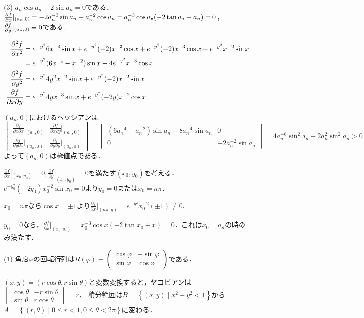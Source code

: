 \documentclass[
		book,
		head_space=20mm,
		foot_space=20mm,
		gutter=10mm,
		line_length=190mm
]{jlreq}
\begin{document}
(3) $a_n \cos a_n -2\sin a_n=0$である．$\pdv{f}{x}|_{(a_n,0)} =-2a_n^{-3}\sin a_n + a_n^{-2}\cos a_n =a_n^{-3}\cos a_n(-2 \tan a_n+a_n)=0$，$\pdv{f}{y}|_{(a_n,0)} =0$である．

\begin{align}
    \pdv[2]{f}{x}&=e^{-y^2}6x^{-4}\sin x+e^{-y^2}(-2)x^{-3}\cos x+e^{-y^2}(-2)x^{-3}\cos x-e^{-y^2}x^{-2}\sin x \\
    &=e^{-y^2}(6x^{-4}-x^{-2})\sin x -4e^{-y^2}x^{-3}\cos x \\
    \pdv[2]{f}{y}&=e^{-y^2}4y^2x^{-2}\sin x+e^{-y^2}(-2)x^{-2}\sin x\\
    \frac{\partial f}{\partial x \partial y}&=e^{-y^2}4yx^{-3}\sin x + e^{-y^2}(-2y)x^{-2}\cos x \\
\end{align}

$(a_n,0)$におけるヘッシアンは
$\begin{vmatrix}
    \frac{\partial f}{\partial x \partial x}|_{(a_n,0)} & \frac{\partial f}{\partial x \partial y}|_{(a_n,0)} \\
    \frac{\partial f}{\partial y \partial x}|_{(a_n,0)} & \frac{\partial f}{\partial y \partial y}|_{(a_n,0)}
\end{vmatrix} = \begin{vmatrix} 
    (6a_n^{-4}-a_n^{-2}) \sin a_n -8a_n^{-4}\sin a_n & 0 \\
        0 & -2 a_n^{-2}\sin a_n
\end{vmatrix}= 4a_n^{-6}\sin^2 a_n +2a_n^2\sin^2 a_n>0$
よって$(a_n,0)$は極値点である．

$\frac{\partial f}{\partial x}|_{(x_0,y_0)}=0, \frac{\partial f}{\partial y}|_{(x_0,y_0)}=0$を満たす$(x_0,y_0)$を考える．$e^{-y_0^2}(-2y_0)x_0^{-2}\sin x_0=0$より$y_0=0$または$x_0=n\pi$．

$x_0=n\pi$なら$\cos x=\pm 1$より$\frac{\partial f}{\partial x}|_{(n\pi,y)}=e^{-y^2}x_0^{-2}{(\pm 1)} \neq 0$．

$y_0=0$なら，$\frac{\partial f}{\partial x}|_{(x_0,y_0)}=x_0^{-3}\cos x(-2\tan x_0 + x )=0$．これは$x_0=a_n$の時のみ満たす．

(1)
角度$\varphi$の回転行列は$R(\varphi)=\begin{pmatrix}
    \cos \varphi & -\sin \varphi \\
    \sin \varphi & \cos \varphi
\end{pmatrix}$である．

$(x,y)=(r\cos \theta, r\sin \theta)$と変数変換すると，ヤコビアンは$\begin{vmatrix}
    \cos \theta & -r\sin \theta \\
    \sin \theta & r\cos \theta
\end{vmatrix}=r$．
積分範囲は$B=\left\{ (x,y) \mid x^2+y^2 < 1\right\}$から$A=\left\{ (r,\theta) \mid 0\le r <1, 0\le \theta<2\pi \right\}$に変わる．
\end{document}
